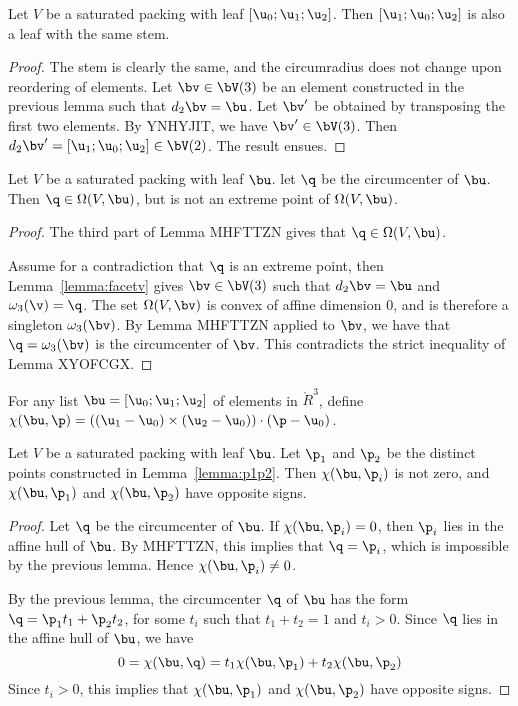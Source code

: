 \begin{lemma}
Let $V$ be a saturated packing with leaf $[\u_0;\u_1;\u_2]$.  Then $[\u_1;\u_0;\u_2]$ is also a leaf
with the same stem.
\end{lemma}

\begin{proof} The stem is clearly the same, and the circumradius does not change upon reordering of
elements.  Let $\bv\in \bV(3)$ be an element constructed in the previous lemma such that
$d_2\bv=\bu$.  Let $\bv'$ be obtained by transposing the first two elements.  By YNHYJIT,
we have $\bv'\in \bV(3)$.    Then $d_2\bv' = [\u_1;\u_0;\u_2]\in \bV(2)$.  The result ensues.
\end{proof}



\begin{lemma}  Let $V$ be a saturated packing with leaf $\bu$.  let $\q$ be the circumcenter of $\bu$.
Then $\q\in\Omega(V,\bu)$, but is not an extreme point of $\Omega(V,\bu)$.
\end{lemma}

\begin{proof} The third part of Lemma MHFTTZN gives that $\q\in \Omega(V,\bu)$. 

Assume for a contradiction that
$\q$ is an extreme point, then Lemma~\ref{lemma:facetv} gives $\bv\in \bV(3)$ such that
$d_2\bv = \bu$ and $\omega_3(\v)=\q$.  The set $\Omega(V,\bv)$ is convex of affine dimension $0$,
and is therefore a singleton $\omega_3(\bv)$.   By Lemma MHFTTZN applied to $\bv$, we have that
$\q=\omega_3(\bv)$ is the circumcenter of $\bv$.  This contradicts the strict inequality of Lemma XYOFCGX.
\end{proof}

\begin{definition}[$\chi$] For any list $\bu = [\u_0;\u_1;\u_2]$ of  elements in $\ring{R}^3$, define 
$\chi(\bu,\p) = ((\u_1-\u_0)\times (\u_2-\u_0))\cdot(\p-\u_0)$.
\end{definition}




\begin{lemma} Let $V$ be a saturated packing with leaf $\bu$.  Let $\p_1$ and $\p_2$ be the
distinct points constructed in Lemma~\ref{lemma:p1p2}.  Then $\chi(\bu,\p_i)$ is not zero,
and $\chi(\bu,\p_1)$ and $\chi(\bu,\p_2)$ have opposite signs.
\end{lemma}

\begin{proof}
Let $\q$ be the circumcenter of $\bu$.
If $\chi(\bu,\p_i) = 0$, then $\p_i$ lies in the affine hull of $\bu$.   By MHFTTZN, this implies that
$\q = \p_i$, which is impossible by the previous lemma.  Hence $\chi(\bu,\p_i)\ne 0$.

By the previous lemma, the circumcenter $\q$ of $\bu$ has the form $\q=\p_1 t_1 + \p_2 t_2$,
for some $t_i$ such that $t_1+t_2=1$ and $t_i>0$.  Since $\q$ lies in the affine hull of $\bu$, we have
\[
0 = \chi(\bu,\q) = t_1 \chi(\bu,\p_1) + t_2 \chi(\bu,\p_2)
\]
Since $t_i>0$, this implies that $\chi(\bu,\p_1)$ and $\chi(\bu,\p_2)$ have opposite signs.
\end{proof}

